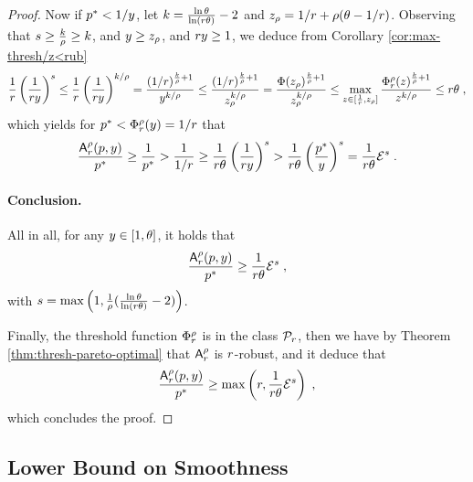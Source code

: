 \begin{proof}
Now if $p^* < 1/y$, let $k = \frac{\ln\theta}{\ln(r \theta)}-2$ and $z_\rho = 1/r + \rho(\theta - 1/r)$. Observing that $s \geq \frac{k}{\rho} \geq k$, and $y \geq z_\rho$, and $r y \geq 1$, we deduce from Corollary \ref{cor:max-thresh/z<rub}
\[
\frac{1}{r}\left( \frac{1}{r y} \right)^s
\leq \frac{1}{r}\left( \frac{1}{r y} \right)^{k/\rho}
= \frac{(1/r)^{\frac{k}{\rho}+1}}{y^{k/\rho}}
\leq \frac{(1/r)^{\frac{k}{\rho}+1}}{z_\rho^{k/\rho}}
= \frac{\Phi(z_\rho)^{\frac{k}{\rho}+1}}{z_\rho^{k/\rho}}
\leq \max_{z \in [\frac{1}{r}, z_\rho]} \frac{\Phi^\rho_r(z)^{\frac{k}{\rho}+1}}{z^{k/\rho}} 
\leq r \theta\;,
\]
which yields for $p^* < \Phi^\rho_r(y) = 1/r$ that
\[
\frac{\mbox{\textup{\textsf{A}}}^\rho_r(p,y)}{p^*} 
\geq \frac{1}{p^*}
> \frac{1}{1/r}
\geq \frac{1}{r \theta} \left( \frac{1}{r y} \right)^s
> \frac{1}{r \theta} \left( \frac{p^*}{y} \right)^s
= \frac{1}{r \theta} \mathcal{E}^s\;.
\]

\paragraph{Conclusion.} 
All in all, for any $y \in [1,\theta]$, it holds that
\[
\frac{\mbox{\textup{\textsf{A}}}^\rho_r(p,y)}{p^*}
\geq \frac{1}{r \theta} \mathcal{E}^s \;,
\]
with $s = \max\left(1,\frac{1}{\rho}( \frac{\ln \theta}{\ln(r \theta)}-2)\right)$.

Finally, the threshold function $\Phi^\rho_r$ is in the class $\mathcal{P}_r$, then we have by Theorem \ref{thm:thresh-pareto-optimal} that $\mbox{\textup{\textsf{A}}}^\rho_r$ is $r$-robust, and it deduce that
\[
\frac{\mbox{\textup{\textsf{A}}}^\rho_r(p,y)}{p^*}
\geq \max\left(r, \frac{1}{r \theta} \mathcal{E}^{s} \right)\;,
\]
which concludes the proof.
  
\end{proof}








\subsection{Lower Bound on Smoothness}
\LowerBoundSmoothness*


